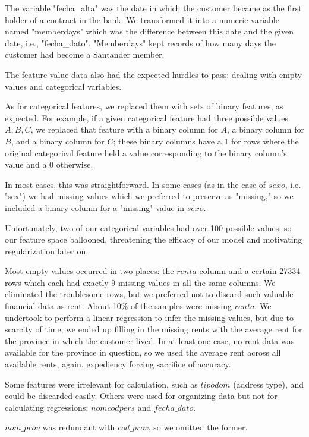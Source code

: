 \documentclass{article}
\begin{document}
\begin{spacing}{1}
\begin{large}
The variable "fecha\_alta" was the date in which the customer became as the first holder of a contract in the bank. We transformed it into a numeric variable named "memberdays" which was the difference between this date and the given date, i.e., "fecha\_dato". "Memberdays" kept records of how many days the customer had become a Santander member.

The feature-value data also had the expected hurdles to pass: dealing with empty values and categorical variables.

As for categorical features, we replaced them with sets of binary features, as expected. For example, if a given categorical feature had three possible values ${A,B,C}$, we replaced that feature with a binary column for $A$, a binary column for $B$, and a binary column for $C$; these binary columns have a 1 for rows where the original categorical feature held a value corresponding to the binary column's value and a 0 otherwise.

In most cases, this was straightforward. In some cases (as in the case of $sexo$, i.e. "sex") we had missing values which we preferred to preserve as "missing," so we included a binary column for a "missing" value in $sexo$.

Unfortunately, two of our categorical variables had over 100 possible values, so our feature space ballooned, threatening the efficacy of our model and motivating regularization later on.

Most empty values occurred in two places: the $renta$ column and a certain 27334 rows which each had exactly 9 missing values in all the same columns. We eliminated the troublesome rows, but we preferred not to discard such valuable financial data as rent. About 10\% of the samples were missing $renta$. We undertook to perform a linear regression to infer the missing values, but due to scarcity of time, we ended up filling in the missing rents with the average rent for the province in which the customer lived. In at least one case, no rent data was available for the province in question, so we used the average rent across all available rents, again, expediency forcing sacrifice of accuracy.

Some features were irrelevant for calculation, such as $tipodom$ (address type), and could be discarded easily. Others were used for organizing data but not for calculating regressions: $nomcodpers$ and $fecha\_dato$.

$nom\_prov$ was redundant with $cod\_prov$, so we omitted the former.


\end{large}
\end{spacing}
\end{document}
